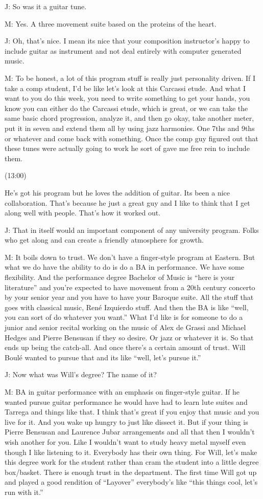 \documentclass[11pt]{article}
\begin{document}
J: So was it a guitar tune.

M: Yes. A three movement suite based on the proteins of the heart.

J: Oh, that's nice. I mean its nice that your composition instructor's happy to include guitar as instrument and not deal entirely with computer generated music. 

M: To be honest, a lot of this program stuff is really just personality driven. If I take a comp student, I'd be like let's look at this Carcassi etude. And what I want to you do this week, you need to write something to get your hands, you know you can either do the Carcassi etude, which is great, or we can take the same basic chord progression, analyze it, and then go okay, take another meter, put it in seven and extend them all by using jazz harmonies. One 7ths and 9ths or whatever and come back with something. Once the comp guy figured out that these tunes were actually going to work he sort of gave me free rein to include them. 

(13:00)

He's got his program but he loves the addition of guitar. Its been a nice collaboration. That's because he just a great guy and I like to think that I get along well with people. That's how it worked out.

J: That in itself would an important component of any university program. Folks who get along and can create a friendly atmosphere for growth. 

M: It boils down to trust. We don't have a finger-style program at Eastern. But what we do have the ability to do is do a BA in performance. We have some flexibility. And the performance degree Bachelor of Music is ``here is your literature'' and you're expected to have movement from a 20th century concerto by your senior year and you have to have your Baroque suite. All the stuff that goes with classical music, René Izquierdo stuff. And then the BA is like ``well, you can sort of do whatever you want.'' What I'd like is for someone to do a junior and senior recital working on the music of Alex de Grassi and Michael Hedges and Pierre Bensusan if they so desire. Or jazz or whatever it is. So that ends up being the catch-all. And once there's a certain amount of trust. Will Boulé wanted to pursue that and its like ``well, let's pursue it.'' 

J: Now what was Will's degree? The name of it?

M: BA in guitar performance with an emphasis on finger-style guitar. If he wanted pursue guitar performance he would have had to learn lute suites and Tarrega and things like that. I think that's great if you enjoy that music and you live for it. And you wake up hungry to just like dissect it. But if your thing is Pierre Bensusan and Laurence Jubar arrangements and all that then I wouldn't wish another for you. Like I wouldn't want to study heavy metal myself even though I like listening to it. Everybody has their own thing. For Will, let's make this degree work for the student rather than cram the student into a little degree box/basket. There is enough trust in the department. The first time Will got up and played a good rendition of ``Layover'' everybody's like ``this things cool, let's run with it.'' 
\end{document}
